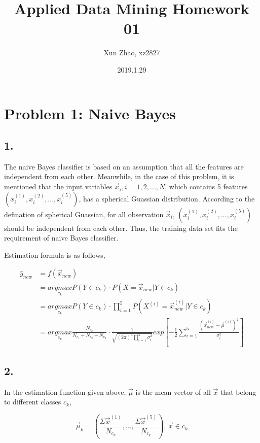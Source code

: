 \documentclass[]{article}
\title{Applied Data Mining Homework 01}
\author{Xun Zhao, xz2827}
\date{2019.1.29}
\begin{document}
\maketitle

\section{Problem 1: Naive Bayes}\label{problem-1-naive-bayes}

\subsection{1.}\label{section}

The naive Bayes classifier is based on an assumption that all the
features are independent from each other. Meanwhile, in the case of this
problem, it is mentioned that the input variables
\({\vec{x}}_i, i = 1, 2, ..., N\), which contains 5 features
\((x_i^{(1)}, x_i^{(2)}, ..., x_i^{(5)})\), has a spherical Guassian
distribution. According to the defination of spherical Guassian, for all
observation \({\vec{x}}_i\),
\((x_i^{(1)}, x_i^{(2)}, ..., x_i^{(5)})\)should be independent from
each other. Thus, the training data set fits the requirement of naive
Bayes classifier.

Estimation formula is as follows,

\[
\begin{aligned}
\hat{y}_{new}&=f({\vec{x}}_{new})\\\
&=\underset{c_k}{arg max}P(Y\in c_k)\cdot P(X = {\vec{x}}_{new}|Y\in c_k)\\\
&=\underset{c_k}{arg max}P(Y \in c_k) \cdot \prod_{i = 1}^{5}P(X^{(i)} = {\vec{x}_{new}^{(i)}}|Y \in c_k)\\\
&=\underset{c_k}{arg max}\frac{N_{c_k}}{N_{c_1} + N_{c_2} + N_{c_3}}\cdot\frac{1}{\sqrt{(2\pi)^5\prod_{i = 1}^{5}{\sigma}_i^2}}exp[-\frac{1}{2}\sum_{i = 1}^{5}\frac{({\vec{x}}_{new}^{(i)} - {\vec{\mu}}^{(i)})^2}{{\sigma}_i^2}]
\end{aligned}
\]

\subsection{2.}\label{section-1}

In the estimation function given above, \({\vec{\mu}}\) is the mean
vector of all \(\vec{x}\) that belong to different classes \(c_k\),

\[{\vec{\mu}}_k = (\frac{\Sigma \vec{x}^{(1)}}{N_{c_k}},  ..., \frac{\Sigma \vec{x}^{(5)}}{N_{c_k}}),\,{\vec{x}}\in c_k\]
\end{document}
